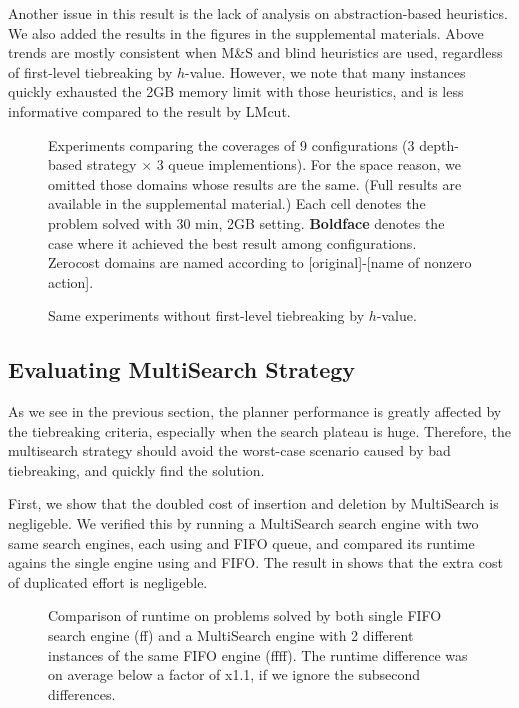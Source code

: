 Another issue in this result is the lack of analysis on
abstraction-based heuristics. We also added the results in the figures
in the supplemental materials. Above trends are mostly consistent when
M\&S and blind heuristics are used, regardless of first-level
tiebreaking by $h$-value. However, we note that many instances quickly
exhausted the 2GB memory limit with those heuristics, and is less
informative compared to the result by LMcut.

\begin{figure}[htb]
 \centering
 
 \caption{Experiments
 comparing the coverages of 9 configurations (3 depth-based strategy
 $\times$ 3 queue implementions). For the space reason, we omitted those
 domains whose results are the same. (Full results are available in the
 supplemental material.) Each cell denotes the problem solved with 30
 min, 2GB setting. \textbf{Boldface} denotes the case where it achieved
 the best result among configurations. Zerocost domains are named
 according to [original]-[name of nonzero action].}
 \label{depth}
\end{figure}

\begin{figure}[htb]
 \centering
 
 \caption{Same experiments without first-level tiebreaking by $h$-value.}
 \label{depth-noh}
\end{figure}


\subsection{Evaluating MultiSearch Strategy}

As we see in the previous section, the planner performance is greatly
affected by the tiebreaking criteria, especially when the search plateau
is huge. Therefore, the multisearch strategy should avoid the
worst-case scenario caused by bad tiebreaking, and quickly find the solution.

First, we show that the doubled cost of insertion and deletion by
MultiSearch is negligeble.  
We verified this by running a MultiSearch search engine with two same search engines, each using \lmcut and FIFO queue, and compared its runtime agains the single engine using \lmcut and FIFO. The result in  shows that the extra cost of duplicated effort is negligeble.

\begin{figure}[htbp]
 \centering
 \caption{Comparison of runtime on problems solved by both single FIFO search engine (ff) and a MultiSearch engine with 2 different instances of the same FIFO engine (ffff). The runtime difference was on average below a factor of x1.1, if we ignore the subsecond differences.}
 \label{ffff}
\end{figure}

